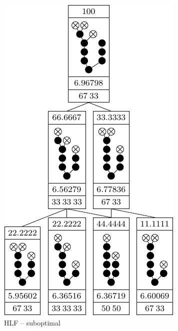 \begin{figure}[ht]
  \centering
  \begin{subfigure}{.45\linewidth}
    \centering
    \includegraphics{p3/hlf_not_optimal/0012346688_subopt.pdf}
    \caption{HLF -- suboptimal}
  \end{subfigure}
  \begin{subfigure}{.45\linewidth}
    \centering

\end{subfigure}
\end{figure}
